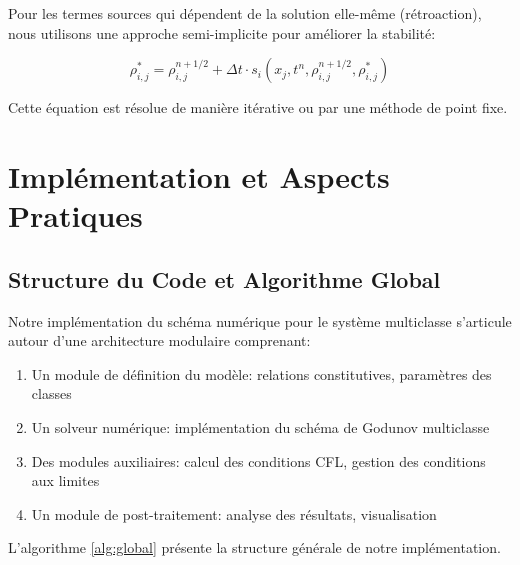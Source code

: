 Pour les termes sources qui dépendent de la solution elle-même (rétroaction), nous utilisons une approche semi-implicite pour améliorer la stabilité:

\begin{equation}
\rho_{i,j}^{*} = \rho_{i,j}^{n+1/2} + \Delta t \cdot s_i(x_j, t^n, \rho_{i,j}^{n+1/2}, \rho_{i,j}^{*})
\end{equation}

Cette équation est résolue de manière itérative ou par une méthode de point fixe.

\section{Implémentation et Aspects Pratiques}
\label{sec:implementation}

\subsection{Structure du Code et Algorithme Global}
\label{subsec:structure_code}

Notre implémentation du schéma numérique pour le système multiclasse s'articule autour d'une architecture modulaire comprenant:

\begin{enumerate}
\item Un module de définition du modèle: relations constitutives, paramètres des classes
\item Un solveur numérique: implémentation du schéma de Godunov multiclasse
\item Des modules auxiliaires: calcul des conditions CFL, gestion des conditions aux limites
\item Un module de post-traitement: analyse des résultats, visualisation
\end{enumerate}

L'algorithme \ref{alg:global} présente la structure générale de notre implémentation.

